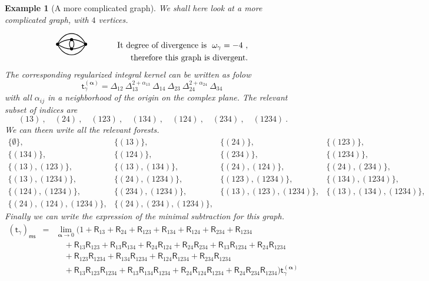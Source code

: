 \documentclass[11pt]{book}
\newcommand{\ms}{\mathsf{ms}}
\newcommand{\alphabd}{\boldsymbol{\alpha}}
\newcommand{\Rsf}{\mathsf{R}}
\newcommand{\tsf}{\mathsf{t}}
\theoremstyle{break}
\newtheorem{example}{Example}[chapter]
\newcommand{\catseye}{\begin{tikzpicture}[thick,scale=1.5]
\useasboundingbox (0,-0.1) rectangle (1,0.4);
\filldraw (0,0) circle (1pt);
\filldraw (0.4,0.13) circle (1pt);
\filldraw (0.4,-0.13) circle (1pt);
\filldraw (0.8,0) circle (1pt);
\draw (0,0) .. controls (0.18,0.4) and (0.62,0.4) .. (0.8,0);
%
\draw (0,0) .. controls (0.18,-0.4) and (0.62,-0.4) .. (0.8,0);
\draw (0,0) edge [out=35,in=145] node[above] {} (0.8,0);
\draw (0,0) edge [out=-35,in=-145] node[above] {} (0.8,0);
\draw (0.4,0.13) edge [out=-25,in=30] node[above] {} (0.4,-0.13);
\draw (0.4,0.13) edge [out=-145,in=140] node[above] {} (0.4,-0.13);
\end{tikzpicture} }
\begin{document}
\begin{example}[A more complicated graph]
We shall here look at a more complicated graph, with $4$ vertices. 
%
\begin{eqnarray*}
\catseye && \qquad \mbox{It degree of divergence is } \ \omega_\gamma = - 4 \ , \\
&& \qquad \mbox{therefore this graph is divergent.}
\end{eqnarray*}
% 
The corresponding regularized integral kernel can be written as folow
%
\begin{equation*}
\tsf_\gamma^{(\alphabd)} = \Delta_{12} \ \Delta_{13}^{2+\alpha_{13}} \ \Delta_{14} \ \Delta_{23} \ \Delta_{24}^{2+\alpha_{24}} \ \Delta_{34} \  
\end{equation*}
%
with all $\alpha_{ij}$ in a neighborhood of the origin on the complex plane. The relevant subset of indices are
%
\begin{equation*}
(13) \ , \quad 
(24) \ , \quad 
(123) \ , \quad
(134) \ , \quad
(124) \ , \quad
(234) \ , \quad
(1234) \ .
\end{equation*}
%
We can theen write all the relevant forests.
%
\begin{equation*}
\begin{array}{llll}
\{\emptyset\}, 
%
&\{(13)\}, 
&\{(24)\}, 
&\{(123)\}, \\
\{(134)\}, 
&\{(124)\}, 
&\{(234)\}, 
&\{(1234)\}, \\ 
%
\{(13),(123)\},
&\{(13),(134)\}, 
&\{(24),(124)\}, 
&\{(24),(234)\}, \\
\{(13),(1234)\}, 
&\{(24),(1234)\}, 
&\{(123),(1234)\},  
&\{(134),(1234)\},\\ 
\{(124),(1234)\}, 
&\{(234),(1234)\},
%
&\{(13),(123),(1234)\}, 
&\{(13),(134),(1234)\}, \\
\{(24),(124),(1234)\}, 
&\{(24),(234),(1234)\},
\end{array}
\end{equation*}
%
Finally we can write the expression of the minimal subtraction for this graph.
%
\begin{eqnarray*}
\left(\tsf_\gamma\right)_\ms &=& \lim_{\alphabd \to 0} 
\bigg( 1
+ \Rsf_{13} 
+ \Rsf_{24}
+ \Rsf_{123}
+ \Rsf_{134}
+ \Rsf_{124}
+ \Rsf_{234}
+ \Rsf_{1234} \\
&& \quad
+ \Rsf_{13} \Rsf_{123}
+ \Rsf_{13} \Rsf_{134}
+ \Rsf_{24} \Rsf_{124}
+ \Rsf_{24} \Rsf_{234}
+ \Rsf_{13} \Rsf_{1234}
+ \Rsf_{24} \Rsf_{1234} \\
&& \quad
+ \Rsf_{123} \Rsf_{1234}
+ \Rsf_{134} \Rsf_{1234}
+ \Rsf_{124} \Rsf_{1234} 
+ \Rsf_{234} \Rsf_{1234} \\
&& \quad 
+ \Rsf_{13} \Rsf_{123} \Rsf_{1234}
+ \Rsf_{13} \Rsf_{134} \Rsf_{1234}
+ \Rsf_{24} \Rsf_{124} \Rsf_{1234}
+ \Rsf_{24} \Rsf_{234} \Rsf_{1234} \bigg) \tsf_\gamma^{(\alphabd)}
\end{eqnarray*}
%
\end{example}
\end{document}
